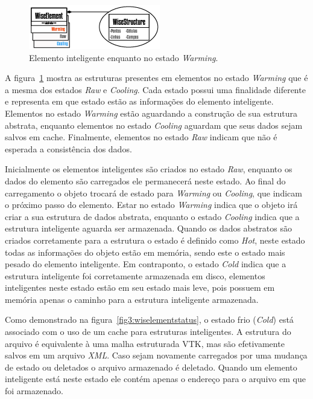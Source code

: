 \documentclass[
        english,			
        brazil			        %
        ,<...>]{abntbibufjf}
\begin{document}
\begin{figure}[!htbp]
	\centering
	\includegraphics[scale=1]{Figures/WiseElementWarming.png}
	\caption{Elemento inteligente enquanto no estado \textit{Warming}.}
	\label{fig4:wiselementwarming}
\end{figure}

A figura~\ref{fig4:wiselementwarming} mostra as estruturas presentes em elementos no estado \textit{Warming} que é a mesma dos estados \textit{Raw} e \textit{Cooling}. Cada estado possui uma finalidade diferente e representa em que estado estão as informações do elemento inteligente. Elementos no estado \textit{Warming} estão aguardando a construção de sua estrutura abstrata, enquanto elementos  no estado \textit{Cooling} aguardam que seus dados sejam salvos em cache. Finalmente, elementos no estado \textit{Raw} indicam que não é esperada a consistência dos dados.

Inicialmente os elementos inteligentes são criados no estado \textit{Raw}, enquanto os dados do elemento são carregados ele permanecerá neste estado. Ao final do carregamento o objeto trocará de estado para \textit{Warming} ou \textit{Cooling}, que indicam o próximo passo do elemento. Estar no estado \textit{Warming} indica que o objeto irá criar a sua estrutura de dados abstrata, enquanto o estado \textit{Cooling} indica que a estrutura inteligente aguarda ser armazenada. Quando os dados abstratos são criados corretamente para a estrutura o estado é definido como \textit{Hot}, neste estado todas as informações do objeto estão em memória, sendo este o estado mais pesado do elemento inteligente. Em contraponto, o estado \textit{Cold} indica que a estrutura inteligente foi corretamente armazenada em disco, elementos inteligentes neste estado estão em seu estado mais leve, pois possuem em memória apenas o caminho para a estrutura inteligente armazenada.

Como demonstrado na figura~\ref{fig3:wiselementstatus}, o estado frio (\textit{Cold}) está associado com o uso de um cache para estruturas inteligentes. A estrutura do arquivo é equivalente à uma malha estruturada VTK, mas são efetivamente salvos em um arquivo \textit{XML}. Caso sejam novamente carregados por uma mudança de estado ou deletados o arquivo armazenado é deletado. Quando um elemento inteligente está neste estado ele contém apenas o endereço para o arquivo em que foi armazenado.
\end{document}

